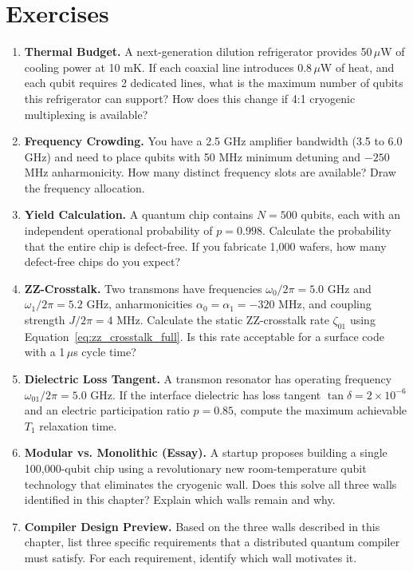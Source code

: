 
\section*{Exercises}

\begin{enumerate}[label=\textbf{1.\arabic*.}]
    \item \textbf{Thermal Budget.} A next-generation dilution refrigerator provides 50$\,\mu$W of cooling power at 10 mK. If each coaxial line introduces 0.8$\,\mu$W of heat, and each qubit requires 2 dedicated lines, what is the maximum number of qubits this refrigerator can support? How does this change if 4:1 cryogenic multiplexing is available?
    
    \item \textbf{Frequency Crowding.} You have a 2.5 GHz amplifier bandwidth (3.5 to 6.0 GHz) and need to place qubits with 50 MHz minimum detuning and $-250$ MHz anharmonicity. How many distinct frequency slots are available? Draw the frequency allocation.
    
    \item \textbf{Yield Calculation.} A quantum chip contains $N = 500$ qubits, each with an independent operational probability of $p = 0.998$. Calculate the probability that the entire chip is defect-free. If you fabricate 1,000 wafers, how many defect-free chips do you expect?
    
    \item \textbf{ZZ-Crosstalk.} Two transmons have frequencies $\omega_0/2\pi = 5.0$ GHz and $\omega_1/2\pi = 5.2$ GHz, anharmonicities $\alpha_0 = \alpha_1 = -320$ MHz, and coupling strength $J/2\pi = 4$ MHz. Calculate the static ZZ-crosstalk rate $\zeta_{01}$ using Equation~\ref{eq:zz_crosstalk_full}. Is this rate acceptable for a surface code with a 1$\,\mu$s cycle time?
    
    \item \textbf{Dielectric Loss Tangent.} A transmon resonator has operating frequency $\omega_{01} / 2\pi = 5.0\text{ GHz}$. If the interface dielectric has loss tangent $\tan \delta = 2 \times 10^{-6}$ and an electric participation ratio $p = 0.85$, compute the maximum achievable $T_1$ relaxation time.
    
    \item \textbf{Modular vs. Monolithic (Essay).} A startup proposes building a single 100,000-qubit chip using a revolutionary new room-temperature qubit technology that eliminates the cryogenic wall. Does this solve all three walls identified in this chapter? Explain which walls remain and why.
    
    \item \textbf{Compiler Design Preview.} Based on the three walls described in this chapter, list three specific requirements that a distributed quantum compiler must satisfy. For each requirement, identify which wall motivates it.
\end{enumerate}
